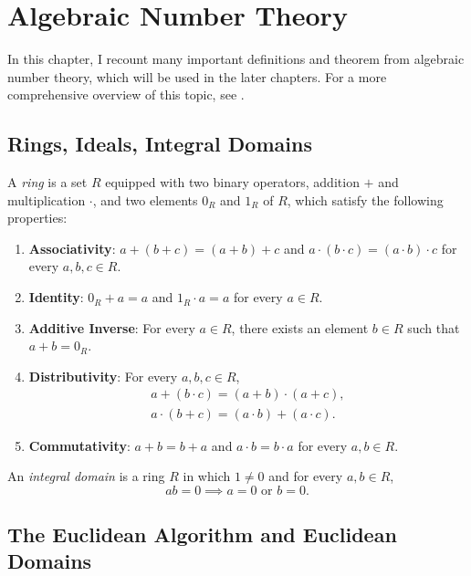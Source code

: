 \chapter{Algebraic Number Theory}
\label{ch:preliminaries}

In this chapter, I recount many important definitions and theorem from
algebraic number theory, which will be used in the later chapters.
For a more comprehensive overview of this topic, see \cite{Dummit04}.

\section{Rings, Ideals, Integral Domains}

\begin{definition}
  A \emph{ring} is a set $R$ equipped with two binary operators, addition $+$
  and multiplication $·$, and two elements $0_R$ and $1_R$ of $R$, which satisfy
  the following properties:
  \begin{enumerate}
    \item \textbf{Associativity}: $a + (b + c) = (a + b) + c$ and $a · (b · c) = (a · b) · c$ for every $a, b, c ∈ R$.
    \item \textbf{Identity}: $0_R + a = a$ and $1_R · a = a$ for every $a ∈ R$.
    \item \textbf{Additive Inverse}: For every $a ∈ R$, there exists an element $b ∈ R$ such that $a + b = 0_R$.
    \item \textbf{Distributivity}: For every $a, b, c ∈ R$,
      \begin{align*}
        a + (b · c) = (a + b) · (a + c), \\
        a · (b + c) = (a · b) + (a · c).
      \end{align*}
    \item \textbf{Commutativity}: $a + b = b + a$ and $a · b = b · a$ for every $a, b ∈ R$.
  \end{enumerate}
\end{definition}

\begin{definition}
  An \emph{integral domain} is a ring $R$ in which $1 ≠ 0$ and for every $a, b ∈ R$,
  \[
    ab = 0 \implies a = 0 \text{ or } b = 0.
  \]
\end{definition}

\section{The Euclidean Algorithm and Euclidean Domains}

